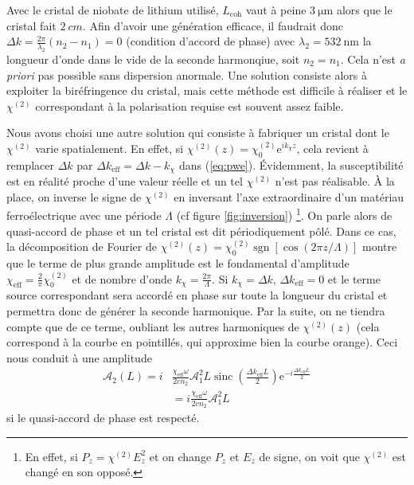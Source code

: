 \documentclass[11pt,a4paper] { article}
\newcommand{\lmbd}[1]{$\SI{#1}{\nano\metre}$}
\newcommand{\A}{\mathcal{A}}
\newcommand{\e}[1]{\text{e}^{#1}}
\newcommand{\mathsc}[1]{\mathrm{\scriptscriptstyle {#1}}}
\begin{document}
Avec le cristal de niobate de lithium utilisé, $L_\mathsc{coh}$ vaut à peine $\SI{3}{\micro\meter}$ alors que le cristal fait $\SI{2}{cm}$.
Afin d'avoir une génération efficace, il faudrait donc $\Delta k = \frac{2\pi}{\lambda_2}(n_2-n_1) = 0$ (condition d'accord de phase) avec $\lambda_2=$\lmbd{532} la longueur d'onde dans le vide de la seconde harmonqiue, soit $n_2 = n_1$. Cela n'est \textit{a priori} pas possible sans dispersion anormale. Une solution consiste alors à exploiter la biréfringence du cristal, mais cette méthode est difficile à réaliser et le $\chi^{(2)}$ correspondant à la polarisation requise est souvent assez faible. 

Nous avons choisi une autre solution qui consiste à fabriquer un cristal dont le $\chi^{(2)}$ varie spatialement. En effet, si $\chi^{(2)}(z) = \chi^{(2)}_0 \e{i k_\chi z}$, cela revient à remplacer $\Delta k$ par $\boxed{ \Delta k_\mathsc{eff} = \Delta k - k_\chi }$ dans (\ref{eq:pwe}). 
Évidemment, la susceptibilité est en réalité proche d'une valeur réelle et un tel $\chi^{(2)}$ n'est pas réalisable. À la place, on inverse le signe de $\chi^{(2)}$ en inversant l'axe extraordinaire d'un matériau ferroélectrique avec une période $\Lambda$ (cf figure \ref{fig:inversion}) \footnote{En effet, si $P_z = \chi^{(2)} E_z^2$ et on change $P_z$ et $E_z$ de signe, on voit que $\chi^{(2)}$ est changé en son opposé.}.
On parle alors de quasi-accord de phase et un tel cristal est dit périodiquement pôlé. Dans ce cas, la décomposition de Fourier de $\chi^{(2)}(z) = \chi^{(2)}_0 \operatorname{sgn}[\cos(2\pi z/ \Lambda)]$ montre que le terme de plus grande amplitude est le fondamental d'amplitude $\boxed{ \chi_\mathsc{eff} = \frac2\pi \chi^{(2)}_0 }$ et de nombre d'onde $\boxed{ k_\chi = \frac{2\pi}{\Lambda} }$. 
Si $k_\chi = \Delta k$, $\Delta k_\mathsc{eff} = 0$ et le terme source correspondant sera accordé en phase sur toute la longueur du cristal et permettra donc de générer la seconde harmonique. Par la suite, on ne tiendra compte que de ce terme, oubliant les autres harmoniques de $\chi^{(2)}(z)$ (cela correspond à la courbe en pointillés, qui approxime bien la courbe orange).
Ceci nous conduit à une amplitude 
\begin{align}
	\A_2(L) = i &\frac{\chi_\mathsc{eff}\omega}{2 cn_2} \A_1^2 L \operatorname{sinc}\left( \frac{\Delta k_\mathsc{eff} L}{2} \right) 
	\e{-i\frac{\Delta k_\mathsc{eff} L}{2}} \\	
	&= i \frac{\chi_\mathsc{eff} \omega}{2 cn_2} \A_1^2L 
\end{align}
si le quasi-accord de phase est respecté.
\end{document}
